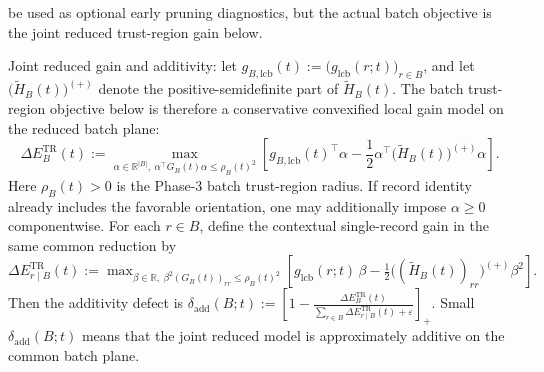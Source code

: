 \documentclass[11pt]{article}
\begin{document}
be used as optional early pruning diagnostics, but the actual batch objective is the joint reduced trust-region gain below.

Joint reduced gain and additivity: let \(g_{B,\mathrm{lcb}}(t):=\bigl(g_{\mathrm{lcb}}(r;t)\bigr)_{r\in B}\), and let \(\bigl(\widetilde H_B(t)\bigr)^{(+)}\) denote the positive-semidefinite part of \(\widetilde H_B(t)\). The batch trust-region objective below is therefore a conservative convexified local gain model on the reduced batch plane:
\[
\Delta E_B^{\mathrm{TR}}(t)
:=
\max_{\alpha\in\mathbb R^{|B|},\ \alpha^\top G_B(t)\alpha\le \rho_B(t)^2}
\left[
g_{B,\mathrm{lcb}}(t)^\top \alpha
-
\frac12 \alpha^\top \bigl(\widetilde H_B(t)\bigr)^{(+)}\alpha
\right].
\]
Here \(\rho_B(t)>0\) is the Phase-3 batch trust-region radius. If record identity already includes the favorable orientation, one may additionally impose \(\alpha\ge 0\) componentwise. For each \(r\in B\), define the contextual single-record gain in the same common reduction by \(\Delta E_{r\mid B}^{\mathrm{TR}}(t):=\max_{\beta\in\mathbb R,\ \beta^2 (G_B(t))_{rr}\le \rho_B(t)^2} \left[ g_{\mathrm{lcb}}(r;t)\,\beta - \frac12 \bigl((\widetilde H_B(t))_{rr}\bigr)^{(+)}\beta^2 \right].\) Then the additivity defect is \(\delta_{\mathrm{add}}(B;t):=\left[ 1- \frac{\Delta E_B^{\mathrm{TR}}(t)} {\sum_{r\in B}\Delta E_{r\mid B}^{\mathrm{TR}}(t)+\varepsilon} \right]_{+}.\) Small \(\delta_{\mathrm{add}}(B;t)\) means that the joint reduced model is approximately additive on the common batch plane.
\end{document}
